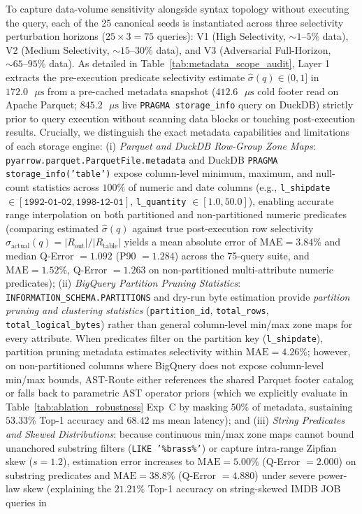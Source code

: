 \documentclass[10pt,a4paper]{article}
\begin{document}
To capture data-volume sensitivity alongside syntax topology without executing the query, each of the 25 canonical seeds is instantiated across three selectivity perturbation horizons ($25 \times 3 = 75$ queries): V1 (High Selectivity, $\sim 1\text{--}5\%$ data), V2 (Medium Selectivity, $\sim 15\text{--}30\%$ data), and V3 (Adversarial Full-Horizon, $\sim 65\text{--}95\%$ data). As detailed in Table~\ref{tab:metadata_scope_audit}, Layer 1 extracts the pre-execution predicate selectivity estimate $\hat{\sigma}(q) \in (0, 1]$ in $172.0\text{ }\mu\text{s}$ from a pre-cached metadata snapshot ($412.6\text{ }\mu\text{s}$ cold footer read on Apache Parquet; $845.2\text{ }\mu\text{s}$ live \texttt{PRAGMA storage\_\allowbreak{}info} query on DuckDB) strictly prior to query execution without scanning data blocks or touching post-execution results. Crucially, we distinguish the exact metadata capabilities and limitations of each storage engine: (i) \emph{Parquet and DuckDB Row-Group Zone Maps}: \texttt{pyarrow.parquet.ParquetFile.metadata} and DuckDB \texttt{PRAGMA storage\_\allowbreak{}info('table')} expose column-level minimum, maximum, and null-count statistics across $100\%$ of numeric and date columns (e.g., \texttt{l\_\allowbreak{}shipdate} $\in [\texttt{1992-01-02}, \texttt{1998-12-01}]$, \texttt{l\_\allowbreak{}quantity} $\in [1.0, 50.0]$), enabling accurate range interpolation on both partitioned and non-partitioned numeric predicates (comparing estimated $\hat{\sigma}(q)$ against true post-execution row selectivity $\sigma_{\text{actual}}(q) = |R_{\text{out}}|/|R_{\text{table}}|$ yields a mean absolute error of $\text{MAE}=3.84\%$ and median Q-Error $=1.092$ (P90 $= 1.284$) across the 75-query suite, and $\text{MAE}=1.52\%$, Q-Error $=1.263$ on non-partitioned multi-attribute numeric predicates); (ii) \emph{BigQuery Partition Pruning Statistics}: \texttt{INFORMATION\_\allowbreak{}SCHEMA.}\newline\texttt{PARTITIONS} and dry-run byte estimation provide \emph{partition pruning and clustering statistics} (\texttt{partition\_\allowbreak{}id}, \texttt{total\_\allowbreak{}rows}, \texttt{total\_\allowbreak{}logical\_\allowbreak{}bytes}) rather than general column-level min/max zone maps for every attribute. When predicates filter on the partition key (\texttt{l\_\allowbreak{}shipdate}), partition pruning metadata estimates selectivity within $\text{MAE}=4.26\%$; however, on non-partitioned columns where BigQuery does not expose column-level min/max bounds, AST-Route either references the shared Parquet footer catalog or falls back to parametric AST operator priors (which we explicitly evaluate in Table~\ref{tab:ablation_robustness} Exp~C by masking $50\%$ of metadata, sustaining $53.33\%$ Top-1 accuracy and $68.42\text{ ms}$ mean latency); and (iii) \emph{String Predicates and Skewed Distributions}: because continuous min/max zone maps cannot bound unanchored substring filters (\texttt{LIKE '\%brass\%'}) or capture intra-range Zipfian skew ($s=1.2$), estimation error increases to $\text{MAE}=5.00\%$ (Q-Error $=2.000$) on substring predicates and $\text{MAE}=38.8\%$ (Q-Error $=4.880$) under severe power-law skew (explaining the $21.21\%$ Top-1 accuracy on string-skewed IMDB JOB queries in 
\end{document}
